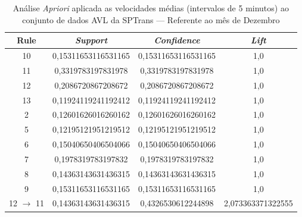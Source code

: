 \documentclass[
	12pt,				%
	oneside,			%
	a4paper,			%
	english,			%
	brazil				%
	]{abntex2ppgsi}
\begin{document}
\begin{apendicesenv}
\begin{table}[!htb]
\centering
\caption {Análise \textit{Apriori} aplicada as velocidades médias (intervalos de 5 minutos) ao conjunto de dados AVL da SPTrans --- Referente ao mês de Dezembro}
\label {tab:aprioriDecember}
\begin{tabular}{c|c|c|c}
\hline
\textbf{Rule} & \textit{\textbf{Support}} & \textit{\textbf{Confidence}} & \textit{\textbf{Lift}} \\
\hline
10 &  0,15311653116531165 &  0,15311653116531165 &  1,0\\
\hline
11 &  0,3319783197831978 &  0,3319783197831978 &  1,0\\
\hline
12 &  0,2086720867208672 &  0,2086720867208672 &  1,0\\
\hline
13 &  0,11924119241192412 &  0,11924119241192412 &  1,0\\
\hline
2 &  0,12601626016260162 &  0,12601626016260162 &  1,0\\
\hline
5 &  0,12195121951219512 &  0,12195121951219512 &  1,0\\
\hline
6 &  0,15040650406504066 &  0,15040650406504066 &  1,0\\
\hline
7 &  0,1978319783197832 &  0,1978319783197832 &  1,0\\
\hline
8 &  0,14363143631436315 &  0,14363143631436315 &  1,0\\
\hline
9 &  0,15311653116531165 &  0,15311653116531165 &  1,0\\
\hline
12 $\rightarrow$ 11 &  0,14363143631436315 &  0,4326530612244898 &  2,073363371322555\\
\hline
\end{tabular}
\end{table}


\end{apendicesenv}
\end{document}
